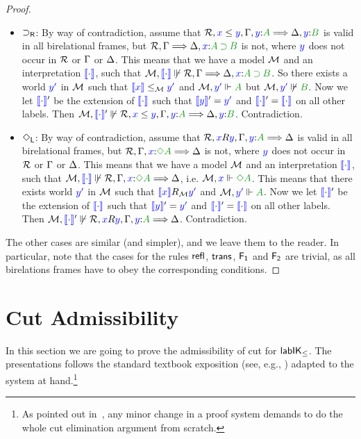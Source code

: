 \documentclass[a4paper]{article}
\begin{document}
\begin{proof}
\begin{itemize}
		\item $\mathsf{\mathbin{\supset}}_{\mathsf{R}}$: By way of contradiction, assume that $\B, \futs xy, \Left, \labels{y}{A} \SEQ \Right, \labels{y}{B}$ is valid in all birelational frames, but $\B, \Left \SEQ \Right, \labels{x}{A \IMP B}$ is not, where ${\color{blue}{y}}$ does not occur in $\mathcal{R}$ or $\Gamma$ or $\Delta$. This means that we have a model $\mathcal{M}$ and an interpretation ${\color{blue}{\llbracket \cdot\rrbracket}}$, such that $\nforce\M{\inter\cdot}{\B, \Left \SEQ \Right, \labels{x}{A \IMP B}}$. So there exists a world ${\color{blue}{y'}}$ in $\mathcal{M}$ such that ${\color{blue}{\llbracket x\rrbracket}}\le_{\mathcal{M}} {\color{blue}{y'}}$ and $\cforce\M{y'}{A}$ but $\nforce\M{\lb{y'}}{\fm B}$. Now we let 	${\color{blue}{\llbracket \cdot\rrbracket}}'$ be the extension of ${\color{blue}{\llbracket \cdot\rrbracket}}$ such that ${\color{blue}{\llbracket y\rrbracket}}'={\color{blue}{y'}}$ and ${\color{blue}{\llbracket \cdot\rrbracket}}'={\color{blue}{\llbracket \cdot\rrbracket}}$ on all other labels. Then $\nforce\M{\inter\cdot'}{\B, \futs xy, \Left, \labels{y}{A} \SEQ \Right, \labels{y}{B}}$. Contradiction.
		
		\item $\mathsf{\mathord{\Diamond}}_{\mathsf{L}}$: By way of contradiction, assume that $\B, \accs xy, \Left, \labels{y}{A} \SEQ \Right$ is valid in all birelational frames, but $\B, \Left, \labels{x}{\DIA A} \SEQ \Right$ is not, where ${\color{blue}{y}}$ does not occur in $\mathcal{R}$ or $\Gamma$ or $\Delta$. This means that we have a model $\mathcal{M}$ and an interpretation ${\color{blue}{\llbracket \cdot\rrbracket}}$, such that $\nforce\M{\inter\cdot}{\B, \Left, \labels{x}{\DIA A} \SEQ \Right}$, i.e. $\cforce \M x{\DIA A}$. This means that there exists world ${\color{blue}{y'}}$ in $\mathcal{M}$ such that ${\color{blue}{\llbracket x\rrbracket}}R_{\mathcal{M}} {\color{blue}{y'}}$ and $\cforce \M {\lb{y'}}{A}$. Now we let ${\color{blue}{\llbracket \cdot\rrbracket}}'$ be the extension of ${\color{blue}{\llbracket \cdot\rrbracket}}$ such that ${\color{blue}{\llbracket y\rrbracket}}'={\color{blue}{y'}}$ and ${\color{blue}{\llbracket \cdot\rrbracket}}' = {\color{blue}{\llbracket \cdot\rrbracket}}$ on all other labels. Then $\nforce\M{\inter\cdot'}{\B, \accs xy, \Left, \labels{y}{A} \SEQ \Right}$. Contradiction.
		
	\end{itemize}
	The other cases are similar (and simpler), and we leave them to the
	reader. In particular, note that the cases for the rules $\mathsf{refl}$,
	$\mathsf{trans}$, $\mathsf{F_1}$ and $\mathsf{F_2}$ are trivial, as all
	birelations frames have to obey the corresponding conditions.
\end{proof}

\section{Cut Admissibility}\label{sec:cut-elim}
In this section we are going to prove the admissibility of cut for
$\mathsf{lab}\mathsf{IK}_{\le}$. The presentations follows the standard textbook
exposition (see, e.g., \cite{troelstra:schwichtenberg:00,negri:vonplato:01})
adapted to the system at hand.\footnote{As pointed out
	in~\cite{girard:87:a}, any minor change in a proof system demands
	to do the whole cut elimination argument from scratch.}
\end{document}
